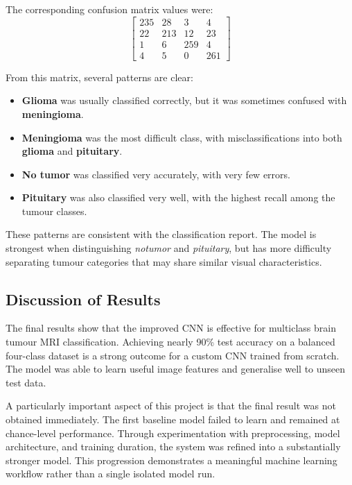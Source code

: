 \documentclass{article}
\begin{document}
The corresponding confusion matrix values were:
\[
\begin{bmatrix}
235 & 28 & 3 & 4 \\
22 & 213 & 12 & 23 \\
1 & 6 & 259 & 4 \\
4 & 5 & 0 & 261
\end{bmatrix}
\]

From this matrix, several patterns are clear:

\begin{itemize}
    \item \textbf{Glioma} was usually classified correctly, but it was sometimes confused with \textbf{meningioma}.
    \item \textbf{Meningioma} was the most difficult class, with misclassifications into both \textbf{glioma} and \textbf{pituitary}.
    \item \textbf{No tumor} was classified very accurately, with very few errors.
    \item \textbf{Pituitary} was also classified very well, with the highest recall among the tumour classes.
\end{itemize}

These patterns are consistent with the classification report. The model is strongest when distinguishing \textit{notumor} and \textit{pituitary}, but has more difficulty separating tumour categories that may share similar visual characteristics.

\subsection{Discussion of Results}

The final results show that the improved CNN is effective for multiclass brain tumour MRI classification. Achieving nearly 90\% test accuracy on a balanced four-class dataset is a strong outcome for a custom CNN trained from scratch. The model was able to learn useful image features and generalise well to unseen test data.

A particularly important aspect of this project is that the final result was not obtained immediately. The first baseline model failed to learn and remained at chance-level performance. Through experimentation with preprocessing, model architecture, and training duration, the system was refined into a substantially stronger model. This progression demonstrates a meaningful machine learning workflow rather than a single isolated model run.
\end{document}
